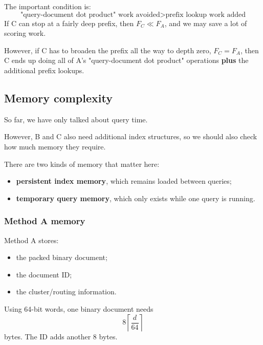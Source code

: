 The important condition is:
\[
\boxed{\text{"query-document dot product" work avoided}>\text{prefix lookup work added}}
\]
If C can stop at a fairly deep prefix, then $F_C\ll F_A$, and we may save a lot of scoring work.

However, if C has to broaden the prefix all the way to depth zero, $F_C=F_A$, then C ends up doing all of A's "query-document dot product" operations \textbf{plus} the additional prefix lookups.

\begin{center}\setlength{\fboxsep}{9pt}\end{center}

\subsection{Memory complexity}
So far, we have only talked about query time.

However, B and C also need additional index structures, so we should also check how much memory they require.

There are two kinds of memory that matter here:
\begin{itemize}\setlength{\itemsep}{1pt}
\item \textbf{persistent index memory}, which remains loaded between queries;
\item \textbf{temporary query memory}, which only exists while one query is running.
\end{itemize}

\subsubsection{Method A memory}
Method A stores:
\begin{itemize}\setlength{\itemsep}{1pt}
\item the packed binary document;
\item the document ID;
\item the cluster/routing information.
\end{itemize}
Using 64-bit words, one binary document needs
\[
8\left\lceil\frac d{64}\right\rceil
\]
bytes. The ID adds another 8 bytes.

